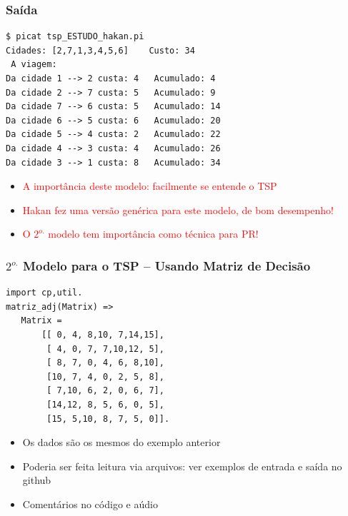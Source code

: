 \begin{frame}[fragile]
 \frametitle{Saída}

\begin{footnotesize}
\begin{verbatim}
$ picat tsp_ESTUDO_hakan.pi 
Cidades: [2,7,1,3,4,5,6]	Custo: 34
 A viagem: 
Da cidade 1 --> 2 custa: 4	 Acumulado: 4
Da cidade 2 --> 7 custa: 5	 Acumulado: 9
Da cidade 7 --> 6 custa: 5	 Acumulado: 14
Da cidade 6 --> 5 custa: 6	 Acumulado: 20
Da cidade 5 --> 4 custa: 2	 Acumulado: 22
Da cidade 4 --> 3 custa: 4	 Acumulado: 26
Da cidade 3 --> 1 custa: 8	 Acumulado: 34
\end{verbatim}
\end{footnotesize}
\pause

\begin{itemize}
  \item \textcolor{red}{A importância deste modelo: facilmente se entende o TSP}
  \pause
   \item \textcolor{red}{Hakan fez uma versão genérica para este modelo, de bom desempenho!}
  \pause
   \item \textcolor{red}{O $2^{o.}$ modelo tem importância como técnica para PR!}


\end{itemize}



\end{frame}


\begin{frame}[fragile]
\frametitle{$2^{o.}$ Modelo para o TSP -- Usando Matriz de Decisão}

\begin{footnotesize}
\begin{verbatim}
import cp,util.
matriz_adj(Matrix) =>
   Matrix = 
       [[ 0, 4, 8,10, 7,14,15],
        [ 4, 0, 7, 7,10,12, 5],
        [ 8, 7, 0, 4, 6, 8,10],
        [10, 7, 4, 0, 2, 5, 8],
        [ 7,10, 6, 2, 0, 6, 7],
        [14,12, 8, 5, 6, 0, 5],
        [15, 5,10, 8, 7, 5, 0]].
\end{verbatim}
\end{footnotesize}


\begin{itemize}
  \item Os dados são os mesmos do exemplo anterior
  \item Poderia ser feita leitura via arquivos: ver exemplos de entrada e saída no github
  \item Comentários no código e aúdio
  \end{itemize}

\end{frame}

